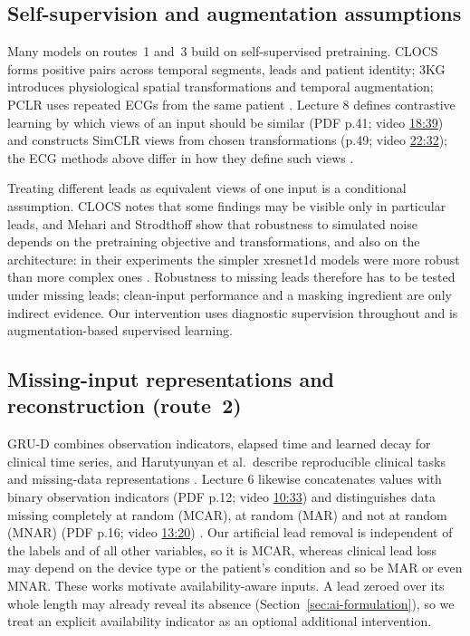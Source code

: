 \subsection{Self-supervision and augmentation assumptions}

Many models on routes~1 and~3 build on self-supervised pretraining. CLOCS forms positive pairs across temporal segments, leads and patient identity; 3KG introduces physiological spatial transformations and temporal augmentation; PCLR uses repeated ECGs from the same patient \citep{kiyasseh2021clocs,gopal2021threeKG,diamant2022pclr}. Lecture 8 defines contrastive learning by which views of an input should be similar (PDF p.41; video \href{https://youtu.be/E5X3YW451Rs?t=1119}{18:39}) and constructs SimCLR views from chosen transformations (p.49; video \href{https://youtu.be/E5X3YW451Rs?t=1352}{22:32}); the ECG methods above differ in how they define such views \citep{md6329lecture08}.

Treating different leads as equivalent views of one input is a conditional assumption. CLOCS notes that some findings may be visible only in particular leads, and Mehari and Strodthoff show that robustness to simulated noise depends on the pretraining objective and transformations, and also on the architecture: in their experiments the simpler xresnet1d models were more robust than more complex ones \citep{kiyasseh2021clocs,mehari2022selfsupervised}. Robustness to missing leads therefore has to be tested under missing leads; clean-input performance and a masking ingredient are only indirect evidence. Our intervention uses diagnostic supervision throughout and is augmentation-based supervised learning.

\subsection{Missing-input representations and reconstruction (route~2)}

GRU-D combines observation indicators, elapsed time and learned decay for clinical time series, and Harutyunyan et al.\ describe reproducible clinical tasks and missing-data representations \citep{che2018grud,harutyunyan2019benchmark}. Lecture 6 likewise concatenates values with binary observation indicators (PDF p.12; video \href{https://youtu.be/AeDzGhM1GBU?t=633}{10:33}) and distinguishes data missing completely at random (MCAR), at random (MAR) and not at random (MNAR) (PDF p.16; video \href{https://youtu.be/AeDzGhM1GBU?t=800}{13:20}) \citep{md6329lecture06}. Our artificial lead removal is independent of the labels and of all other variables, so it is MCAR, whereas clinical lead loss may depend on the device type or the patient's condition and so be MAR or even MNAR. These works motivate availability-aware inputs. A lead zeroed over its whole length may already reveal its absence (Section~\ref{sec:ai-formulation}), so we treat an explicit availability indicator as an optional additional intervention.

